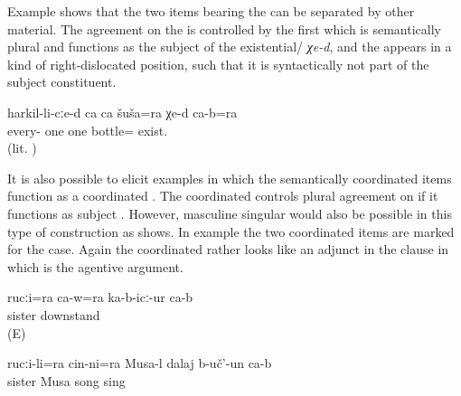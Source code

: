 Example  shows that the two items bearing the   can be separated by other material. The agreement on the  is controlled by the first   which is semantically plural and functions as the  subject of the existential\slash {} \textit{χe-d}, and the  appears in a kind of right-dislocated position, such that it is syntactically not part of the subject constituent. 
%
\begin{exe}
	\ex	\label{ex:‎Everybody is with a bottle in their hands. (lit. There is one bottle each in everybody's (hand), and they also.)}
	\gll	harkil-li-cːe-d	ca	ca	šuša=ra	χe-d	ca-b=ra\\
		every-	one	one bottle=	exist.		\\
	\glt	{} (lit. )
\end{exe}
%
It is also possible to elicit examples in which the semantically coordinated items function as a coordinated . The coordinated  controls plural agreement on  if it functions as subject . However, masculine singular would also be possible in this type of construction as  shows. In example  the two coordinated items are marked for the  case. Again the coordinated  rather looks like an adjunct in the clause in which  is the agentive argument.
%
\begin{exe}
	\ex	\label{ex:‎He and (his) sister were standing there}
	\gll	rucːi=ra	ca-w=ra	ka-b-icː-ur	ca-b\\
		sister		downstand	\\
	\glt	{} (E)

	\ex	\label{ex:Musa sang a song together with his sister}
	\gll	rucːi-li=ra	cin-ni=ra	Musa-l	dalaj	b-uč'-un	ca-b\\
		sister		Musa	song	sing	\\
	\glt	{}
\end{exe}


